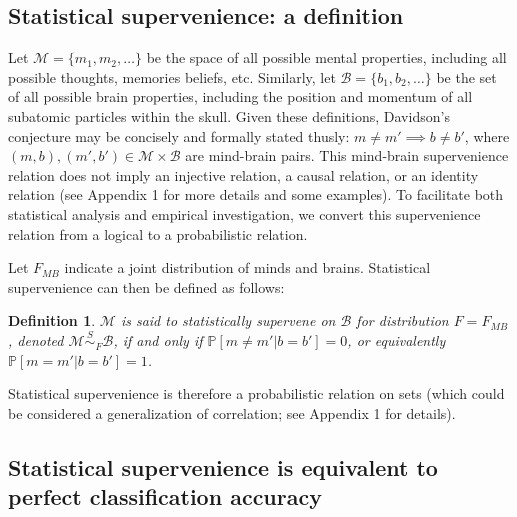 \documentclass{article}
\newcommand{\mB}{\mathcal{B}}
\newcommand{\mM}{\mathcal{M}}
\newcommand{\PP}{\mathbb{P}}           %
\providecommand{\mc}[1]{\mathcal{#1}}
\newtheorem{defi}{Definition}
\begin{document}
\subsection*{Statistical supervenience: a definition} %

\noindent Let $\mc{M}=\{m_1, m_2, \ldots\}$ be the space of all possible mental properties, including all possible thoughts, memories beliefs, etc.
Similarly, let $\mc{B}=\{b_1,b_2,\ldots\}$ be the set of all possible brain properties,
including the position and momentum of all subatomic particles within the skull.  
Given these definitions, Davidson's conjecture may be concisely and formally stated thusly:  $m \neq m' \implies b \neq b'$, where $(m,b), (m',b') \in \mc{M} \times \mc{B}$ are mind-brain pairs.  This mind-brain supervenience relation does not imply an injective relation, a causal relation, or an identity relation (see Appendix 1 for more details and some examples).  To facilitate both statistical analysis and empirical investigation, we convert this supervenience relation from a logical to a probabilistic relation.  

Let $F_{MB}$ indicate a joint distribution of minds and brains. Statistical supervenience can then be defined as follows:
\begin{defi}
\label{def1} 
$\mM$ is said to \textit{statistically supervene} on $\mB$ for distribution $F=F_{MB}$, denoted $\mM \overset{S}{\sim}_F \mB$, if and only if $\PP[m \neq m' | b=b']=0$, or equivalently $\PP[m = m' | b = b']=1$. 
\end{defi}
\noindent Statistical supervenience is therefore a probabilistic relation on sets (which could be considered a generalization of correlation; see Appendix 1 for details).  



\subsection*{Statistical supervenience is equivalent to perfect classification accuracy} %
\label{sub:theoretical_results}
\end{document}
